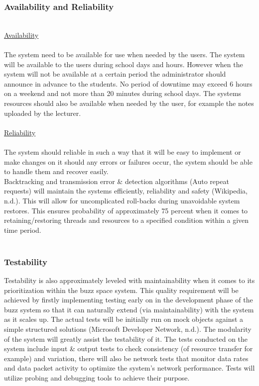 \subsubsection{Availability and Reliability}
\\
\underline{Availability\\}
\\The system need to be available for use when needed by the users. The system will be available to the users during school days and hours. However when the system will not be available at a certain period the administrator should announce in advance to the students. No period of downtime may exceed 6 hours on a weekend and not more than 20 minutes during school days. The systems resources should also be available when needed by the user, for example the notes uploaded by the lecturer. \\
\\
\underline{Reliability\\}
\\The system should reliable in such a way that it will be easy to implement or make changes on it should any errors or failures occur, the system should be able to handle them and recover easily.\\
Backtracking and transmission error & detection algorithms (Auto repeat requests) will maintain the systems efficiently, reliability and safety (Wikipedia, n.d.). This will allow for uncomplicated roll-backs during unavoidable system restores. This ensures probability of approximately 75 percent when it comes to retaining/restoring threads and resources to a specified condition within a given time period.\\
\\
\subsubsection{Testability}
Testability is also approximately leveled with maintainability when it comes to its prioritization within the buzz space system. This quality requirement will be achieved by firstly implementing testing early on in the development phase of the buzz system so that it can naturally extend (via maintainability) with the system as it scales up. The actual tests will be initially run on mock objects against a simple structured solutions (Microsoft Developer Network, n.d.). The modularity of the system will greatly assist the testability of it. The tests conducted on the system include input & output tests to check consistency (of resource transfer for example) and variation, there will also be network tests that monitor data rates and data packet activity to optimize the system’s network performance. Tests will utilize probing and debugging tools to achieve their purpose.\\
\\

